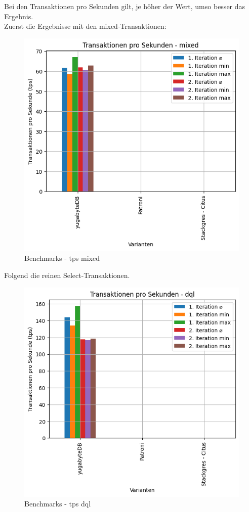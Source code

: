 \begin{flushleft}
    Bei den Transaktionen pro Sekunden gilt, je höher der Wert, umso besser das Ergebnis.\\
    Zuerst die Ergebnisse mit den mixed-Transaktionen:
    \begin{figure}[H]
        \centering
        \includegraphics[width=1\linewidth]{source/pandas_data_chart_plotter/tps_mixed}
        \caption{Benchmarks - tps mixed}
        \label{fig:tps_mixed}
    \end{figure}

    Folgend die reinen Select-Transaktionen.
    \begin{figure}[H]
        \centering
        \includegraphics[width=1\linewidth]{source/pandas_data_chart_plotter/tps_dql}
        \caption{Benchmarks - tps dql}
        \label{fig:tps_dql}
    \end{figure}


\end{flushleft}
